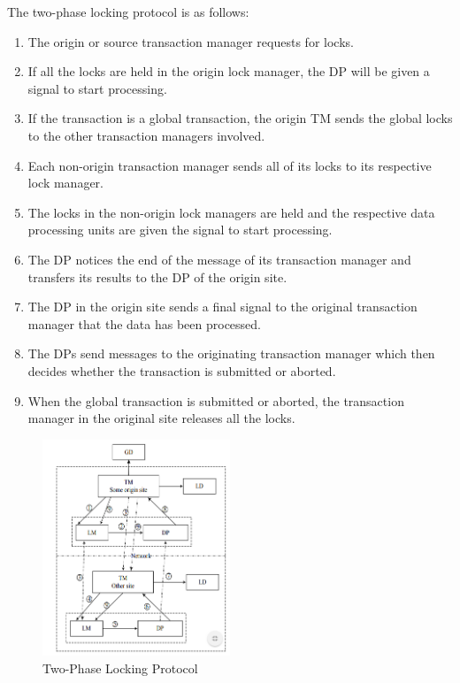 \documentclass[letterpaper, 10 pt, conference]{ieeeconf}
\begin{document}
The two-phase locking protocol is as follows:
\begin{enumerate}
    \item The origin or source transaction manager requests for locks.
    \item If all the locks are held in the origin lock manager, the DP will be given a signal to start processing.
    \item If the transaction is a global transaction, the origin TM sends the global locks to the other transaction managers involved.
    \item Each non-origin transaction manager sends all of its locks to its respective lock manager.
    \item The locks in the non-origin lock managers are held and the respective data processing units are given the signal to start processing.
    \item The DP notices the end of the message of its transaction manager and transfers its results to the DP of the origin site.
    \item The DP in the origin site sends a final signal to the original transaction manager that the data has been processed.
    \item The DPs send messages to the originating transaction manager which then decides whether the transaction is submitted or aborted.
    \item When the global transaction is submitted or aborted, the transaction manager in the original site releases all the locks.
\end{enumerate}


\begin{figure}[H] %
	\centering
	\includegraphics [width=0.5\textwidth] {Figures/Two Stage Lock.png} 
    \caption{Two-Phase Locking Protocol \cite{8}}
\end{figure}
 
\end{document}
